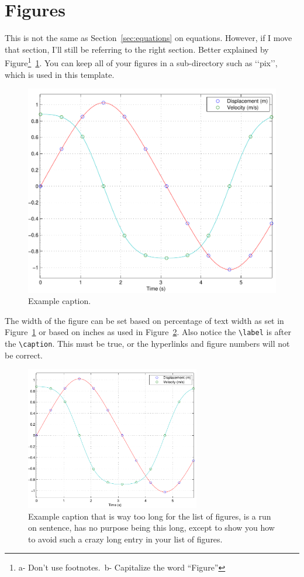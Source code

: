 \documentclass[12pt]{report}
\begin{document}
\section{Figures}
This is not the same as Section~\ref{sec:equations} on equations. However, if I move that section, I'll still be referring to the right section.
Better explained by Figure\footnote{a- Don't use footnotes.\ b- Capitalize the word ``Figure''}~\ref{fig:example}.  You can keep all of your figures in a sub-directory such as \lq\lq{}pix\rq\rq{}, which is used in this template.
\begin{figure}[htbp] %
   \centering
   \includegraphics[width=.5\textwidth]{WSUThesisTemplate/pix/example.pdf} %
   \caption{Example caption.}
\label{fig:example}
\end{figure}

The width of the figure can be set based on percentage of text width as set in Figure~\ref{fig:example} or based on inches as used in Figure~\ref{fig:example2}.  Also notice the \verb'\label' is after the \verb'\caption'.  This must be true, or the hyperlinks and figure numbers will not be correct.

\begin{figure}[!t] %
   \centering
   \includegraphics[width=3in]{WSUThesisTemplate/pix/example.pdf} %
   \caption[Short Figure Caption]{Example caption that is way too long for the list of figures, is a run on sentence, has no purpose being this long, except to show you how to avoid such a crazy long entry in your list of figures.}
\label{fig:example2}
\end{figure}
\end{document}

